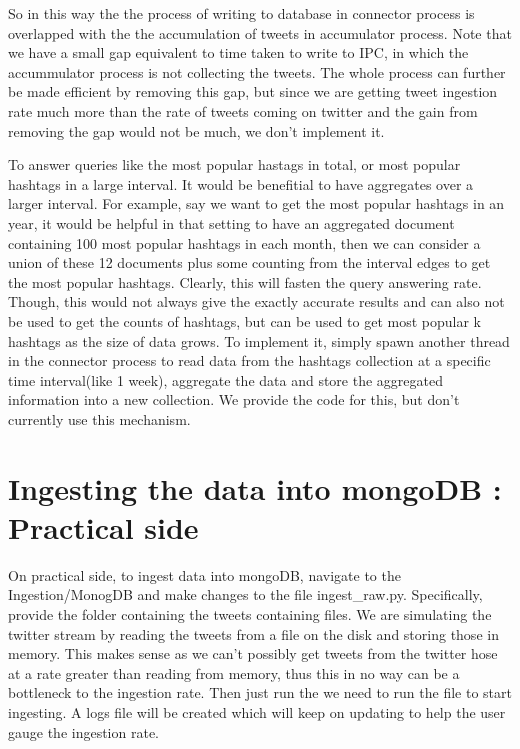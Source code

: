 \documentclass[letterpaper,10pt,english]{sphinxmanual}
\begin{document}
So in this way the the process of writing to database in connector process is overlapped with the the accumulation of tweets in accumulator process. Note that we have a small gap equivalent to time taken to write to IPC, in which the accummulator process is not collecting the tweets. The whole process can further be made efficient by removing this gap, but since we are getting tweet ingestion rate much more than the rate of tweets coming on twitter and the gain from removing the gap would not be much, we don’t implement it.

To answer queries like the most popular hastags in total, or most popular hashtags in a large interval. It would be benefitial to have aggregates over a larger interval. For example, say we want to get the most popular hashtags in an year, it would be helpful in that setting to have an aggregated document containing 100 most popular hashtags in each month, then we can consider a union of these 12 documents plus some counting from the interval edges to get the most popular hashtags. Clearly, this will fasten the query answering rate. Though, this would not always give the exactly accurate results and can also not be used to get the counts of hashtags, but can be used to get most popular k hashtags as the size of data grows. To implement it, simply spawn another thread in the connector process to read data from the hashtags collection at a specific time interval(like 1 week), aggregate the data and store the aggregated information into a new collection. We provide the code for this, but don’t currently use this mechanism.


\section{Ingesting the data into mongoDB : Practical side}
\label{\detokenize{mongoDB_data_ingestion:ingesting-the-data-into-mongodb-practical-side}}
On practical side, to ingest data into mongoDB, navigate to the Ingestion/MonogDB and make changes to the file ingest\_raw.py. Specifically, provide the folder containing the tweets containing files. We are simulating the twitter stream by reading the tweets from a file on the disk and storing those in memory. This makes sense as we can’t possibly get tweets from the twitter hose at a rate greater than reading from memory, thus this in no way can be a bottleneck to the ingestion rate. Then just run the we need to run the file  to start ingesting. A logs file will be created which will keep on updating to help the user gauge the ingestion rate.
\end{document}

